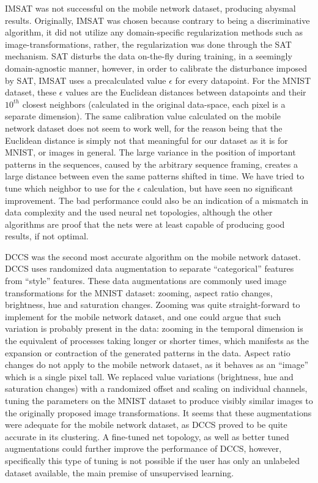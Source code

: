 			\ac{IMSAT} was not successful on the mobile network dataset, producing abysmal results.
			Originally, \ac{IMSAT} was chosen because contrary to being a discriminative algorithm, it did not utilize any domain-specific regularization methods such as image-transformations, rather, the regularization was done through the \ac{SAT} mechanism.
			\ac{SAT} disturbs the data on-the-fly during training, in a seemingly domain-agnostic manner, however, in order to calibrate the disturbance imposed by \ac{SAT}, \ac{IMSAT} uses a precalculated value $\epsilon$ for every datapoint.
			For the MNIST dataset, these $\epsilon$ values are the Euclidean distances between datapoints and their $10^{th}$ closest neighbors (calculated in the original data-space, each pixel is a separate dimension).
			The same calibration value calculated on the mobile network dataset does not seem to work well, for the reason being that the Euclidean distance is simply not that meaningful for our dataset as it is for MNIST, or images in general.
			The large variance in the position of important patterns in the sequences, caused by the arbitrary sequence framing, creates a large distance between even the same patterns shifted in time.
			We have tried to tune which neighbor to use for the $\epsilon$ calculation, but have seen no significant improvement.
			The bad performance could also be an indication of a mismatch in data complexity and the used neural net topologies, although the other algorithms are proof that the nets were at least capable of producing good results, if not optimal.
			
			\ac{DCCS} was the second most accurate algorithm on the mobile network dataset.
			\ac{DCCS} uses randomized data augmentation to separate ``categorical'' features from ``style'' features.
			These data augmentations are commonly used image transformations for the MNIST dataset: zooming, aspect ratio changes, brightness, hue and saturation changes.
			Zooming was quite straight-forward to implement for the mobile network dataset, and one could argue that such variation is probably present in the data: zooming in the temporal dimension is the equivalent of processes taking longer or shorter times, which manifests as the expansion or contraction of the generated patterns in the data.
			Aspect ratio changes do not apply to the mobile network dataset, as it behaves as an ``image'' which is a single pixel tall.
			We replaced value variations (brightness, hue and saturation changes) with a randomized offset and scaling on individual channels, tuning the parameters on the MNIST dataset to produce visibly similar images to the originally proposed image transformations.
			It seems that these augmentations were adequate for the mobile network dataset, as \ac{DCCS} proved to be quite accurate in its clustering.
			A fine-tuned net topology, as well as better tuned augmentations could further improve the performance of \ac{DCCS}, however, specifically this type of tuning is not possible if the user has only an unlabeled dataset available, the main premise of unsupervised learning.
			
